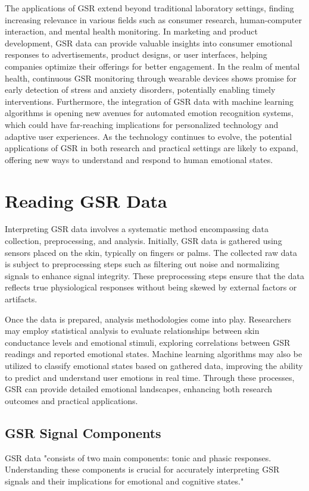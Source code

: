 \documentclass[twocolumn]{article}
\begin{document}
The applications of GSR extend beyond traditional laboratory settings, finding increasing relevance in various fields such as consumer research, human-computer interaction, and mental health monitoring. In marketing and product development, GSR data can provide valuable insights into consumer emotional responses to advertisements, product designs, or user interfaces, helping companies optimize their offerings for better engagement. In the realm of mental health, continuous GSR monitoring through wearable devices shows promise for early detection of stress and anxiety disorders, potentially enabling timely interventions. Furthermore, the integration of GSR data with machine learning algorithms is opening new avenues for automated emotion recognition systems, which could have far-reaching implications for personalized technology and adaptive user experiences. As the technology continues to evolve, the potential applications of GSR in both research and practical settings are likely to expand, offering new ways to understand and respond to human emotional states.
\cite{Chen_Zeng_Chen_Cai_Wang_Wang_Zhang_Li_Yan_Siok_et_al._2024}

\section{Reading GSR Data}

Interpreting GSR data involves a systematic method encompassing data collection, preprocessing, and analysis. Initially, GSR data is gathered using sensors placed on the skin, typically on fingers or palms. The collected raw data is subject to preprocessing steps such as filtering out noise and normalizing signals to enhance signal integrity. These preprocessing steps ensure that the data reflects true physiological responses without being skewed by external factors or artifacts.

Once the data is prepared, analysis methodologies come into play. Researchers may employ statistical analysis to evaluate relationships between skin conductance levels and emotional stimuli, exploring correlations between GSR readings and reported emotional states. Machine learning algorithms may also be utilized to classify emotional states based on gathered data, improving the ability to predict and understand user emotions in real time. Through these processes, GSR can provide detailed emotional landscapes, enhancing both research outcomes and practical applications.

\subsection{GSR Signal Components}
GSR data "consists of two main components: tonic and phasic responses. Understanding these components is crucial for accurately interpreting GSR signals and their implications for emotional and cognitive states."\cite{Hernando-Gallego_Luengo_Artés-Rodríguez_2018}
\end{document}
